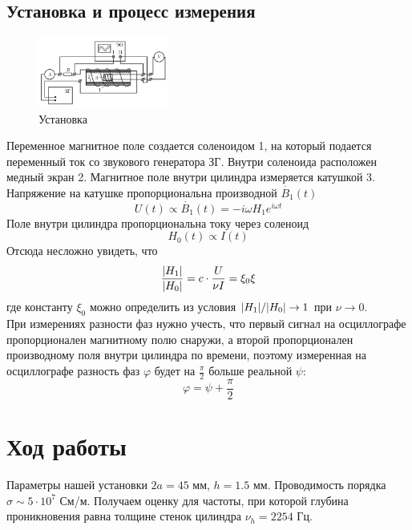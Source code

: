 \documentclass[a4paper, 12pt]{article}
\begin{document}
	\subsection*{Установка и процесс измерения}
	\begin{figure}
		\begin{center}
			\includegraphics[width=0.38\textwidth]{ustanovka}
		\end{center}
		\caption{Установка}\label{fig:ustanovka}
	\end{figure}
	
	Переменное магнитное поле создается соленоидом 1, на который подается переменный ток со звукового генератора ЗГ. Внутри соленоида расположен медный экран 2. Магнитное поле внутри цилиндра измеряется катушкой 3. Напряжение на катушке пропорциональна производной $\dot{B_1}(t)$
	\begin{equation*}
		U(t) \propto \dot{B_1}(t) = -i\omega H_1 e^{i\omega t}
	\end{equation*}
	Поле внутри цилиндра пропорциональна току через соленоид
	\begin{equation*}
		H_0(t) \propto I(t)
	\end{equation*}
	Отсюда несложно увидеть, что
	\begin{equation}
		\frac{\abs{H_1}}{\abs{H_0}} = c \cdot \frac{U}{\nu I} = \xi_0 \xi
		\label{eq:otnoshenie_amplitud}
	\end{equation}
	где константу  $\xi_0$ можно определить из условия $\abs{H_1}/\abs{H_0} \rightarrow 1$ при
	$\nu \rightarrow 0$.\\
	
	При измерениях разности фаз нужно учесть, что первый сигнал на осциллографе
	пропорционален магнитному полю снаружи, а второй пропорционален производному
	поля внутри цилиндра по времени, поэтому измеренная на осциллографе разность фаз $\varphi$ будет на $\frac{\pi}{2}$ больше реальной $\psi$:
	\[\varphi = \psi + \frac{\pi}{2}\]

	\section*{Ход работы}
	
	Параметры нашей установки $2a = 45$ мм, $h=1.5$ мм. Проводимость порядка
	$\sigma \sim 5\cdot 10^7$ См/м. Получаем оценку для частоты, при которой
	глубина проникновения равна толщине стенок цилиндра $\nu_h = 2254$ Гц.
	
\end{document}
